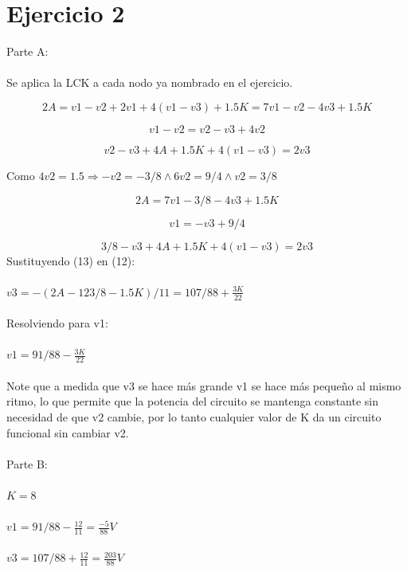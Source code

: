 \documentclass{article}
\begin{document}
\section{Ejercicio 2}
Parte A: \\ \\
Se aplica la LCK a cada nodo ya nombrado en el ejercicio.

\begin{equation}
    2A = v1-v2 + 2v1 + 4(v1-v3) + 1.5K = 7v1 - v2 -4v3 + 1.5K 
\end{equation}

\begin{equation}
    v1-v2 = v2-v3 + 4v2
\end{equation}

\begin{equation}
    v2-v3 + 4A + 1.5K + 4(v1-v3) =  2v3
\end{equation}

Como $4v2 = 1.5 \Longrightarrow -v2 = -3/8 \land 6v2 = 9/4 \land v2 = 3/8$

\begin{equation}
    2A = 7v1 - 3/8 -4v3 + 1.5K 
\end{equation}

\begin{equation}
    v1 = -v3 + 9/4
\end{equation}

\begin{equation}
    3/8-v3 + 4A + 1.5K + 4(v1-v3) =  2v3
\end{equation}
Sustituyendo (13) en (12): \\ \\
$v3 = -(2A - 123/8 -1.5K)/11 = 107/88  + \frac{3K}{22}$ \\ \\
Resolviendo para v1: \\ \\
$v1 = 91/88  - \frac{3K}{22}$ \\ \\
Note que a medida que v3 se hace más grande v1 se hace más pequeño al mismo ritmo, lo que permite que la potencia del circuito se mantenga constante sin necesidad de que v2 cambie, por lo tanto cualquier valor de K da un circuito funcional sin cambiar v2.\\ \\
Parte B:\\ \\ 
$K = 8$\\ \\
$v1 = 91/88 - \frac{12}{11} = \frac{-5}{88}V$\\ \\
$v3 = 107/88 + \frac{12}{11} = \frac{203}{88}V$\\
\end{document}

